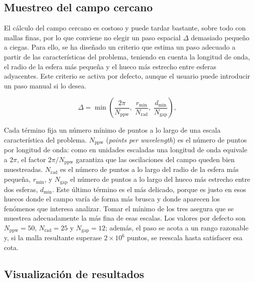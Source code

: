\subsection{Muestreo del campo cercano}
\label{subsec:adaptive_step}
El cálculo del campo cercano es costoso y puede tardar bastante, sobre
todo con mallas finas, por lo que conviene no elegir un paso espacial $\Delta$
demasiado pequeño a ciegas. Para ello, se ha diseñado un criterio 
que estima un paso adecuado a partir de las características del problema, teniendo
en cuenta la longitud de onda, el radio de la esfera más pequeña y el hueco más 
estrecho entre esferas adyacentes. 
Este criterio se activa por defecto, aunque el usuario puede introducir 
un paso manual si lo desea.

\begin{equation}
    \Delta = \min\!\left(
        \frac{2\pi}{N_{\text{ppw}}},\;
        \frac{r_{\min}}{N_{\text{rad}}},\;
        \frac{d_{\min}}{N_{\text{gap}}}
    \right),
    \label{eq:dmin}
\end{equation}

Cada término fija un número mínimo de puntos a lo largo de una escala
característica del problema. $N_{\text{ppw}}$ (\emph{points per
wavelength}) es el número de puntos por longitud de onda: como en
unidades escaladas una longitud de onda equivale a $2\pi$, el factor
$2\pi/N_{\text{ppw}}$ garantiza que las oscilaciones del campo queden bien
muestreadas. $N_{\text{rad}}$ es el número de puntos a lo largo del radio
de la esfera más pequeña, $r_{\min}$, y $N_{\text{gap}}$ el número de
puntos a lo largo del hueco más estrecho entre dos esferas, $d_{\min}$.
Este último término es el más delicado, porque es justo en esos
huecos donde el campo varía de forma más brusca y donde aparecen los
fenómenos que interesa analizar. Tomar el mínimo de los tres
asegura que se muestrea adecuadamente la más fina de esas escalas. Los
valores por defecto son $N_{\text{ppw}}=50$, $N_{\text{rad}}=25$ y
$N_{\text{gap}}=12$; además, el paso se acota a un rango razonable y, si
la malla resultante superase $2\times 10^{6}$ puntos, se reescala hasta
satisfacer esa cota.


\subsection{Visualización de resultados}
\label{subsec:visualizacion}

